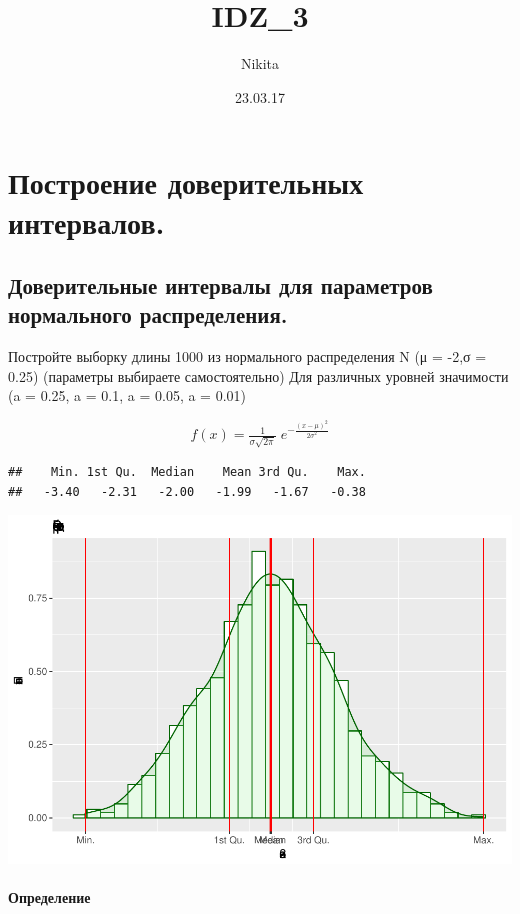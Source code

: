 \documentclass[]{article}
\title{IDZ\_3}
\author{Nikita}
\date{23.03.17}
\let\oldparagraph\paragraph
\renewcommand{\paragraph}[1]{\oldparagraph{#1}\mbox{}}
\begin{document}
\maketitle

{
\setcounter{tocdepth}{2}
\tableofcontents
}
\section{Построение доверительных интервалов.}\label{--.}

\subsection{Доверительные интервалы для параметров нормального
распределения.}\label{-----.}

Постройте выборку длины 1000 из нормального распределения N (μ = -2,σ =
0.25) (параметры выбираете самостоятельно) Для различных уровней
значимости (a = 0.25, a = 0.1, a = 0.05, a = 0.01)

\[f(x)={\tfrac {1}{\sigma {\sqrt {2\pi }}}}\;e^{-{\frac {(x-\mu )^{2}}{2\sigma ^{2}}}}\]

\begin{verbatim}
##    Min. 1st Qu.  Median    Mean 3rd Qu.    Max. 
##   -3.40   -2.31   -2.00   -1.99   -1.67   -0.38
\end{verbatim}

\includegraphics{README_figs/README-graph-1.pdf}

\paragraph{Определение}
\end{document}
